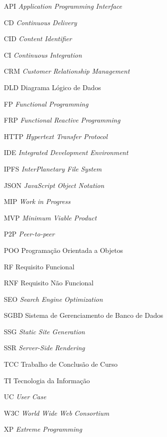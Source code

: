 \begin{siglas}
  \item[API] \textit{Application Programming Interface}
  \item[CD] \textit{Continuous Delivery}
  \item[CID] \textit{Content Identifier}
  \item[CI] \textit{Continuous Integration}
  \item[CRM] \textit{Customer Relationship Management}
  \item[DLD] Diagrama Lógico de Dados
  \item[FP] \textit{Functional Programming} 
  \item[FRP] \textit{Functional Reactive Programming}
  \item[HTTP] \textit{Hypertext Transfer Protocol}
  \item[IDE] \textit{Integrated Development Environment}
  \item[IPFS] \textit{InterPlanetary File System}
  \item[JSON] \textit{JavaScript Object Notation}
  \item[MIP] \textit{Work in Progress}
  \item[MVP] \textit{Minimum Viable Product}
  \item[P2P] \textit{Peer-to-peer}
  \item[POO] Programação Orientada a Objetos
  \item[RF] Requisito Funcional
  \item[RNF] Requisito Não Funcional
  \item[SEO] \textit{Search Engine Optimization}
  \item[SGBD] Sistema de Gerenciamento de Banco de Dados
  \item[SSG] \textit{Static Site Generation}
  \item[SSR] \textit{Server-Side Rendering}
  \item[TCC] Trabalho de Conclusão de Curso
  \item[TI] Tecnologia da Informação
  \item[UC] \textit{User Case}
  \item[W3C] \textit{World Wide Web Consortium}
  \item[XP] \textit{Extreme Programming}
\end{siglas}
